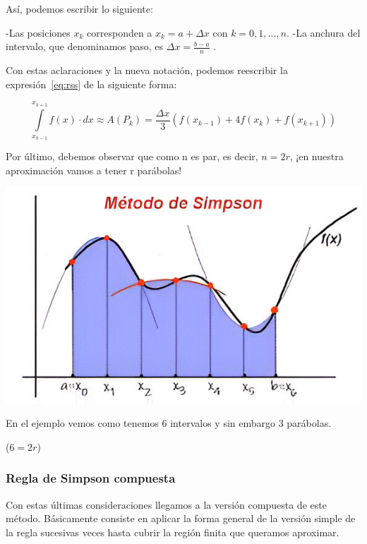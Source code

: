 \documentclass{article}
\begin{document}
		Así, podemos escribir lo siguiente:
		
		\begin{flushleft}
			-Las posiciones $x_k$ corresponden a $x_k=a+\Delta x$ con $k=0,1,...,n$.\newline
			-La anchura del intervalo, que denominamos paso, es $\Delta x=\frac{b-a}{n}$ .
		\end{flushleft}
		
		Con estas aclaraciones y la nueva notación, podemos reescribir la expresión~\ref{eq:rss} de la siguiente forma:
		
		\begin{equation}
			\int \limits_{x_{k-1}}^{x_{k+1}} f(x) \cdot dx \approx 
			A(P_k) =
			\frac{\Delta x}{3}(f(x_{k-1})+4f(x_k)+f(x_{k+1}))
		\end{equation}
		
		Por último, debemos observar que como n es par, es decir, $n=2r$, ¡en nuestra aproximación vamos a tener r parábolas!\\
		
		\begin{center}
			\includegraphics[scale=0.45]{rpara}
		\end{center}
		
		En el ejemplo vemos como tenemos 6 intervalos y sin embargo 3 parábolas. \begin{center}($6=2r$)\end{center}
		
		\subsubsection{Regla de Simpson compuesta}
		
			Con estas últimas consideraciones llegamos a la versión compuesta de este método. Básicamente consiste en aplicar la forma general de la versión simple de la regla sucesivas veces hasta cubrir la región finita que queramos aproximar.\\
			
\end{document}
